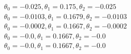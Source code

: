 \documentclass[11pt]{article} %
\begin{document}
\begin{figure}[h]
\qquad
{}
\qquad
{}
\end{figure}
\(\theta_0 = -0.025, \theta_1= 0.175 , \theta_2= -0.025\)\\
\(\theta_0= -0.0103, \theta_1= 0.1679 , \theta_2 =-0.0103\)\\
\(\theta_0 =-0.0002, \theta_1= 0.1667 , \theta_2 =-0.0002\)\\
\(\theta_0 =-0.0, \theta_1 =0.1667 , \theta_2 =-0.0\)\\
\(\theta_0 =-0.0, \theta_1= 0.1667 , \theta_2 =-0.0\)\\
\end{document}
